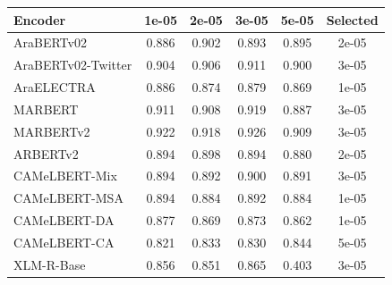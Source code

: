\begin{tabular}{lccccc}
\toprule
\textbf{Encoder} & 1e-05 & 2e-05 & 3e-05 & 5e-05 & \textbf{Selected} \\
\midrule
AraBERTv02 & 0.886 & 0.902 & 0.893 & 0.895 & 2e-05 \\
AraBERTv02-Twitter & 0.904 & 0.906 & 0.911 & 0.900 & 3e-05 \\
AraELECTRA & 0.886 & 0.874 & 0.879 & 0.869 & 1e-05 \\
MARBERT & 0.911 & 0.908 & 0.919 & 0.887 & 3e-05 \\
MARBERTv2 & 0.922 & 0.918 & 0.926 & 0.909 & 3e-05 \\
ARBERTv2 & 0.894 & 0.898 & 0.894 & 0.880 & 2e-05 \\
CAMeLBERT-Mix & 0.894 & 0.892 & 0.900 & 0.891 & 3e-05 \\
CAMeLBERT-MSA & 0.894 & 0.884 & 0.892 & 0.884 & 1e-05 \\
CAMeLBERT-DA & 0.877 & 0.869 & 0.873 & 0.862 & 1e-05 \\
CAMeLBERT-CA & 0.821 & 0.833 & 0.830 & 0.844 & 5e-05 \\
XLM-R-Base & 0.856 & 0.851 & 0.865 & 0.403 & 3e-05 \\
\bottomrule
\end{tabular}
